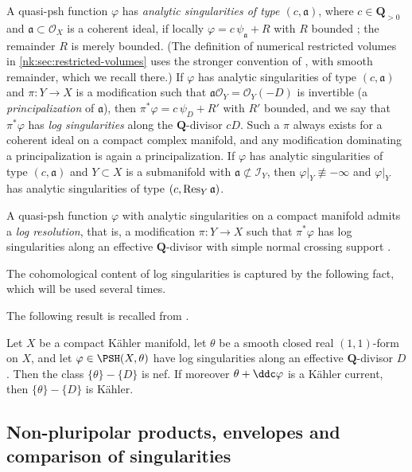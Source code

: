 A quasi-psh function $\varphi$ has \emph{analytic singularities of type
$(c,\mathfrak a)$}, where $c\in\mathbf Q_{>0}$ and $\mathfrak a\subset\mathcal O_X$ is a coherent
ideal, if locally $\varphi=c\,\psi_\mathfrak a+R$ with $R$ bounded
\cite[Definition~1.6.1]{SGPT}; the remainder $R$ is merely bounded.
(The definition of numerical restricted volumes in
\cref{nk:sec:restricted-volumes} uses the stronger convention of
\cite[Section~2]{CT22Restricted}, with smooth remainder, which we recall there.)
If $\varphi$ has analytic singularities of type
$(c,\mathfrak a)$ and $\pi\colon Y\to X$ is a modification such that
$\mathfrak a\mathcal O_Y=\mathcal O_Y(-D)$ is invertible (a \emph{principalization} of
$\mathfrak a$), then $\pi^*\varphi=c\,\psi_D+R'$ with $R'$ bounded, and we
say that $\pi^*\varphi$ has \emph{log singularities} along the
$\mathbf Q$-divisor $cD$. Such a $\pi$ always exists for a coherent ideal
on a compact complex manifold, and any modification dominating a
principalization is again a principalization. If $\varphi$ has analytic
singularities of type $(c,\mathfrak a)$ and $Y\subset X$ is a submanifold with
$\mathfrak a\not\subset\mathcal I_Y$, then $\varphi|_Y\not\equiv-\infty$ and
$\varphi|_Y$ has analytic singularities of type $(c,\operatorname{Res}_{Y}\mathfrak a)$.

A quasi-psh function $\varphi$ with analytic singularities on a compact
manifold admits a \emph{log resolution},
that is, a modification $\pi\colon Y\to X$ such that $\pi^*\varphi$ has
log singularities along an effective $\mathbf Q$-divisor with simple normal
crossing support \cite[Theorem~1.6.1]{SGPT}.

The cohomological content of log singularities is captured by the
following fact, which will be used several times.

The following result is recalled from \cite[Lemma~1.6.1]{SGPT}.

\begin{lemma}\label{nk:lem:residual-nef}
Let $X$ be a compact K\"ahler manifold, let $\theta$ be a smooth
closed real $(1,1)$-form on $X$, and let $\varphi\in\PSH(X,\theta)$
have log singularities along an effective $\mathbf Q$-divisor $D$.
Then the class $\{\theta\}-\{D\}$ is nef. If moreover
$\theta+\ddc\varphi$ is a K\"ahler current, then $\{\theta\}-\{D\}$
is K\"ahler.
\end{lemma}

\subsection{Non-pluripolar products, envelopes and comparison of
singularities}\label{nk:sec:npp}

